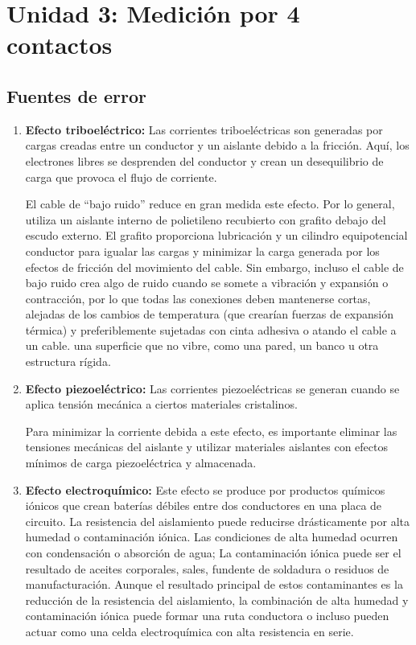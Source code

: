 \section{Unidad 3: Medición por 4 contactos}

\subsection{Fuentes de error}
\begin{enumerate}
    \item %
    \textbf{Efecto triboeléctrico:} Las corrientes triboeléctricas son generadas por cargas creadas entre un conductor y un aislante debido a la fricción. Aquí, los electrones libres se desprenden del conductor y crean un desequilibrio de carga que provoca el flujo de corriente. 
    
    El cable de “bajo ruido” reduce en gran medida este efecto. Por lo general, utiliza un aislante interno de polietileno recubierto con grafito debajo del escudo externo. El grafito proporciona lubricación y un cilindro equipotencial conductor para igualar las cargas y minimizar la carga generada por los efectos de fricción del movimiento del cable. Sin embargo, incluso el cable de bajo ruido crea algo de ruido cuando se somete a vibración y expansión o contracción, por lo que todas las conexiones deben mantenerse cortas, alejadas de los cambios de temperatura (que crearían fuerzas de expansión térmica) y preferiblemente sujetadas con cinta adhesiva o atando el cable a un cable. una superficie que no vibre, como una pared, un banco u otra estructura rígida.

    \item %
    \textbf{Efecto piezoeléctrico:} Las corrientes piezoeléctricas se generan cuando se aplica tensión mecánica a ciertos materiales cristalinos.
    
    Para minimizar la corriente debida a este efecto, es importante eliminar las tensiones mecánicas del aislante y utilizar materiales aislantes con efectos mínimos de carga piezoeléctrica y almacenada.

    
    \item %
    \textbf{Efecto electroquímico:} Este efecto se produce por productos químicos iónicos que crean baterías débiles entre dos conductores en una placa de circuito. La resistencia del aislamiento puede reducirse drásticamente por alta humedad o contaminación iónica. Las condiciones de alta humedad ocurren con condensación o absorción de agua; La contaminación iónica puede ser el resultado de aceites corporales, sales, fundente de soldadura o residuos de manufacturación. Aunque el resultado principal de estos contaminantes es la reducción de la resistencia del aislamiento, la combinación de alta humedad y contaminación iónica puede formar una ruta conductora o incluso pueden actuar como una celda electroquímica con alta resistencia en serie.
    

\end{enumerate}
